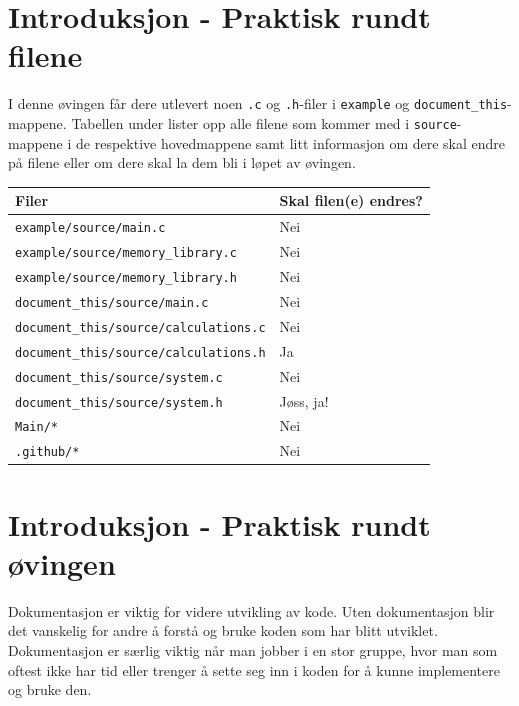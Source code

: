 

\begin{alphasection}

\section{Introduksjon - Praktisk rundt filene}

I denne øvingen får dere utlevert noen \verb|.c| og \verb|.h|-filer i \verb|example| og \verb|document_this|-mappene. Tabellen under lister opp alle filene som kommer med i \verb|source|-mappene i de respektive hovedmappene samt litt informasjon om dere skal endre på filene eller om dere skal la dem bli i løpet av øvingen.

\begin{center}
 \begin{tabular}{|p{8.5cm} p{5.5cm}|} 
 \hline
 \textbf{Filer} & \textbf{Skal filen(e) endres?}  \\ [0.5ex] 
 \hline\hline
 \verb|example/source/main.c| & Nei  \\ 
 \hline
 \verb|example/source/memory_library.c| & Nei  \\ 
 \hline
 \verb|example/source/memory_library.h| & Nei  \\ 
 \hline
  \verb|document_this/source/main.c| & Nei  \\ 
 \hline
 \verb|document_this/source/calculations.c| & Nei  \\ 
 \hline
 \verb|document_this/source/calculations.h| & Ja  \\ 
 \hline
 \verb|document_this/source/system.c| & Nei  \\ 
 \hline
 \verb|document_this/source/system.h| & Jøss, ja!  \\ 
 \hline
  \verb|Main/*| & Nei  \\ 
 \hline
  \verb|.github/*| & Nei \\
 \hline 
\end{tabular}
\end{center}

\section{Introduksjon - Praktisk rundt øvingen}\label{sec:intro}
Dokumentasjon er viktig for videre utvikling av kode. Uten dokumentasjon blir det vanskelig for andre å forstå og bruke koden som har blitt utviklet. Dokumentasjon er særlig viktig når man jobber i en stor gruppe, hvor man som oftest ikke har tid eller trenger å sette seg inn i koden for å kunne implementere og bruke den.


\end{alphasection}
